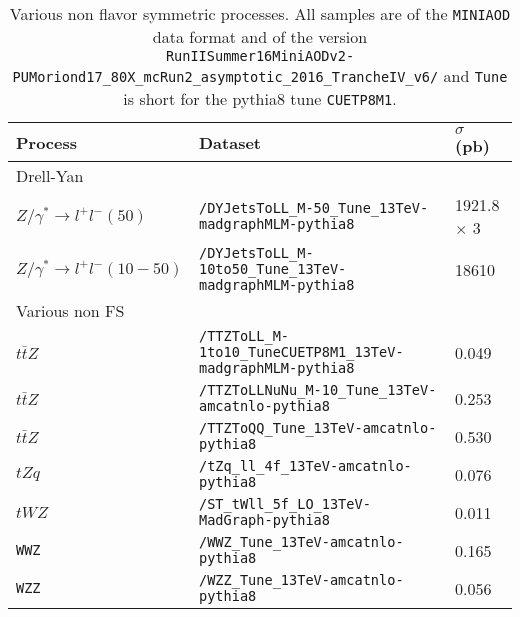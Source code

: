 \begin{table}[ht!]
\begin{center}
\def\arraystretch{1.2}
    \caption{Various non flavor symmetric processes. All samples are of the \texttt{MINIAOD} data format and of the version 
      \\  \texttt{RunIISummer16MiniAODv2-PUMoriond17\_80X\_mcRun2\_asymptotic\_2016\_TrancheIV\_v6/} and \texttt{Tune} is short for the pythia8 tune \texttt{CUETP8M1}.}
    \label{tab:MCsamplesNonFS}
        \begin{tabular}{|l l l|}
        \hline \hline    
        Process     &  Dataset  &  $\sigma$ (pb)          \\\hline
        Drell-Yan     &    &            \\
        \scriptsize{\texttt{$Z/\gamma^{*}\rightarrow l^{+}l^{-} (50)$}}     & \scriptsize{\texttt{/DYJetsToLL\_M-50\_Tune\_13TeV-madgraphMLM-pythia8}}      &  \scriptsize{1921.8 $\times$ 3}       \\
        \scriptsize{\texttt{$Z/\gamma^{*}\rightarrow l^{+}l^{-} (10-50)$}}     & \scriptsize{\texttt{/DYJetsToLL\_M-10to50\_Tune\_13TeV-madgraphMLM-pythia8}}  &  \scriptsize{18610}      \\
        Various non FS     &    &            \\
        \scriptsize{\texttt{$t\bar{t}Z$}}     & \scriptsize{\texttt{/TTZToLL\_M-1to10\_TuneCUETP8M1\_13TeV-madgraphMLM-pythia8}}  &  \scriptsize{0.049}     \\                
        \scriptsize{\texttt{$t\bar{t}Z$}}     & \scriptsize{\texttt{/TTZToLLNuNu\_M-10\_Tune\_13TeV-amcatnlo-pythia8}}  &  \scriptsize{0.253}     \\                
        \scriptsize{\texttt{$t\bar{t}Z$}}     & \scriptsize{\texttt{/TTZToQQ\_Tune\_13TeV-amcatnlo-pythia8}}  &  \scriptsize{0.530}     \\              
        \scriptsize{\texttt{$tZq$}}     & \scriptsize{\texttt{/tZq\_ll\_4f\_13TeV-amcatnlo-pythia8}}  &  \scriptsize{0.076}      \\                           
        \scriptsize{\texttt{$tWZ$}}     & \scriptsize{\texttt{/ST\_tWll\_5f\_LO\_13TeV-MadGraph-pythia8}}  & \scriptsize{0.011}      \\     
        \scriptsize{\texttt{WWZ}}     & \scriptsize{\texttt{/WWZ\_Tune\_13TeV-amcatnlo-pythia8}}  & \scriptsize{0.165}      \\      
        \scriptsize{\texttt{WZZ}}     & \scriptsize{\texttt{/WZZ\_Tune\_13TeV-amcatnlo-pythia8}}  & \scriptsize{0.056}      \\      

\hline\hline
\end{tabular}
\end{center}
\end{table}                                                                                                                                                                              
